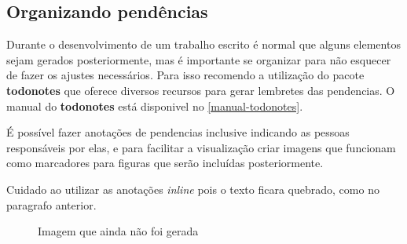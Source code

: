 \subsection{Organizando pendências}

Durante o desenvolvimento de um trabalho escrito é normal que alguns elementos sejam gerados posteriormente, mas é importante se organizar para não esquecer de fazer os ajustes necessários. Para isso recomendo a utilização do pacote \textbf{todonotes} que oferece diversos recursos para gerar lembretes das pendencias. O manual do \textbf{todonotes} está disponivel no \autoref{manual-todonotes}.

É possível fazer anotações de pendencias inclusive indicando as pessoas responsáveis por elas, %
 e para facilitar a visualização criar imagens que funcionam como marcadores para figuras que serão incluídas posteriormente.

Cuidado ao utilizar as anotações \emph{inline} pois o texto ficara quebrado, como no paragrafo anterior.


\begin{figure}[htb]
    \centering
	\caption{\label{fig_todo1}Imagem que ainda não foi gerada}
\end{figure}



